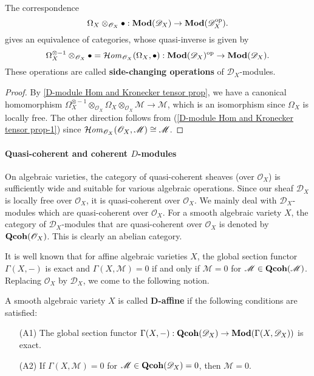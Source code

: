 \begin{proposition}\label{D-module side change by Omega_X}
The correspondence
\[\Omega_X\otimes_{\mathscr{O}_X}\bullet:\mathbf{Mod}(\mathscr{D}_X)\to\mathbf{Mod}(\mathscr{D}_X^{\mathrm{op}}).\]
gives an equivalence of categories, whose quasi-inverse is given by
\[\Omega_X^{\otimes-1}\otimes_{\mathscr{O}_X}\bullet=\operatorname{\mathcal{H}\hspace*{-0.4pt}\textit{om}\hspace{0.5pt}}_{\mathscr{O}_X}(\Omega_X,\bullet):\mathbf{Mod}(\mathscr{D}_X)^{\mathrm{op}}\to\mathbf{Mod}(\mathscr{D}_X).\]
These operations are called \textbf{side-changing operations} of $\mathscr{D}_X$-modules.
\end{proposition}
\begin{proof}
By \cref{D-module Hom and Kronecker tensor prop}, we have a canonical homomorphism $\Omega_X^{\otimes-1}\otimes_{\mathscr{O}_X}\Omega_X\otimes_{\mathscr{O}_X}\mathscr{M}\to\mathscr{M}$, which is an isomorphism since $\Omega_X$ is locally free. The other direction follows from (\ref{D-module Hom and Kronecker tensor prop-1}) since $\operatorname{\mathcal{H}\hspace*{-0.4pt}\textit{om}\hspace{0.5pt}}_{\mathscr{O}_X}(\mathscr{O}_X,\mathscr{M})\cong\mathscr{M}$.
\end{proof}

\paragraph{Quasi-coherent and coherent \texorpdfstring{$D$}{D}-modules}
On algebraic varieties, the category of quasi-coherent sheaves (over $\mathscr{O}_X$) is sufficiently wide and suitable for various algebraic operations. Since our sheaf $\mathscr{D}_X$ is locally free over $\mathscr{O}_X$, it is quasi-coherent over $\mathscr{O}_X$. We mainly deal with $\mathscr{D}_X$-modules which are quasi-coherent over $\mathscr{O}_X$. For a smooth algebraic variety $X$, the category of $\mathscr{D}_X$-modules that are quasi-coherent over $\mathscr{O}_X$ is denoted by $\mathbf{Qcoh}(\mathscr{O}_X)$. This is clearly an abelian category.\par
It is well known that for affine algebraic varieties $X$, the global section functor $\Gamma(X,-)$ is exact and $\Gamma(X,\mathscr{M})=0$ if and only if $\mathscr{M}=0$ for $\mathscr{M}\in\mathbf{Qcoh}(\mathscr{M})$. Replacing $\mathscr{O}_X$ by $\mathscr{D}_X$, we come to the following notion.
\begin{definition}
A smooth algebraic variety $X$ is called \textbf{$\bm{D}$-affine} if the following conditions are satisfied:
\begin{enumerate}[leftmargin=40pt]
    \item[(A1)] The global section functor $\Gamma(X,-):\mathbf{Qcoh}(\mathscr{D}_X)\to\mathbf{Mod}(\Gamma(X,\mathscr{D}_X))$ is exact.
    \item[(A2)] If $\Gamma(X,\mathscr{M})=0$ for $\mathscr{M}\in\mathbf{Qcoh}(\mathscr{D}_X)=0$, then $\mathscr{M}=0$.
\end{enumerate}
\end{definition}


